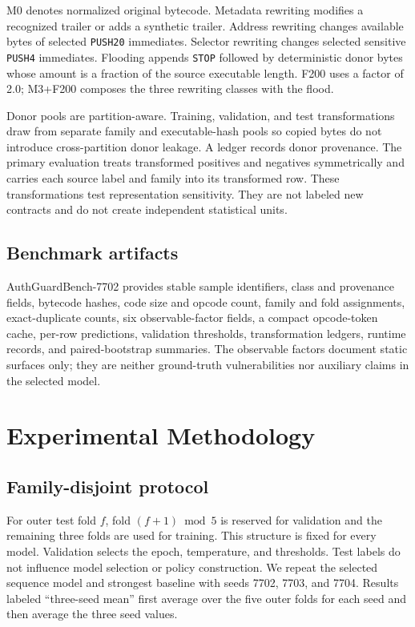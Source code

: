 \documentclass[conference]{IEEEtran}
\newcommand{\bench}{AuthGuardBench-7702}
\newcommand{\code}[1]{\texttt{#1}}
\begin{document}
M0 denotes normalized original bytecode. Metadata rewriting modifies a recognized trailer or
adds a synthetic trailer. Address rewriting changes available bytes of selected \code{PUSH20}
immediates. Selector rewriting changes selected sensitive \code{PUSH4} immediates. Flooding
appends \code{STOP} followed by deterministic donor bytes whose amount is a fraction of the
source executable length. F200 uses a factor of 2.0; M3+F200 composes the three rewriting classes
with the flood.

Donor pools are partition-aware. Training, validation, and test transformations draw from
separate family and executable-hash pools so copied bytes do not introduce cross-partition donor
leakage. A ledger records donor provenance. The primary evaluation treats transformed positives
and negatives symmetrically and carries each source label and family into its transformed row.
These transformations test representation sensitivity. They are not labeled new contracts and
do not create independent statistical units.

\subsection{Benchmark artifacts}

\bench{} provides stable sample identifiers, class and provenance fields, bytecode hashes, code
size and opcode count, family and fold assignments, exact-duplicate counts, six observable-factor
fields, a compact opcode-token cache, per-row predictions, validation thresholds, transformation
ledgers, runtime records, and paired-bootstrap summaries. The observable factors document static
surfaces only; they are neither ground-truth vulnerabilities nor auxiliary claims in the selected
model.

\section{Experimental Methodology}
\label{sec:methodology}

\subsection{Family-disjoint protocol}

For outer test fold $f$, fold $(f+1)\bmod 5$ is reserved for validation and the remaining three
folds are used for training. This structure is fixed for every model. Validation selects the
epoch, temperature, and thresholds. Test labels do not influence model selection or policy
construction. We repeat the selected sequence model and strongest baseline with seeds 7702,
7703, and 7704. Results labeled ``three-seed mean'' first average over the five outer folds for
each seed and then average the three seed values.
\end{document}

